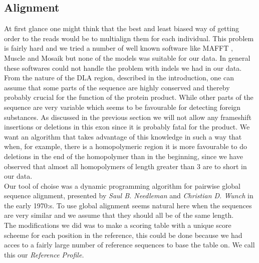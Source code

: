 \subsection{Alignment}



At first glance one might think that the best and least biased way of getting order to the reads would be to multialign them for each individual. This problem is fairly hard and we tried a number of well known software like MAFFT \cite{mafft} , Muscle \cite{muscle} and Mosaik \cite{mosaik} but none of the models was suitable for our data. In general these softwares could not handle the problem with indels we had in our data.\\
 
From the nature of the DLA region, described in the introduction, one can assume that some parts of the sequence are highly conserved and thereby probably crucial for the function of the protein product. While other parts of the sequence are very variable which seems to be favourable for detecting foreign substances. As discussed in the previous section we will not allow any frameshift insertions or deletions in this exon since it is probably fatal for the product. We want an algorithm that takes advantage of this knowledge in such a way that when, for example, there is a homopolymeric region it is more favourable to do deletions in the end of the homopolymer than in the beginning, since we have observed that almost all homopolymers of length greater than 3 are to short in our data.\\

Our tool of choise was a dynamic programming algorithm for pairwise global sequence alignment, presented by \emph{Saul B. Needleman} and \emph{Christian D. Wunch} \cite{nw} in the early 1970:s. To use global alignment seems natural here when the sequences are very similar and we assume that they should all be of the same length.\\

The modifications we did was to make a scoring table with a unique score scheeme for each position in the reference, this could be done because we had acces to a fairly large number of reference sequences to base the table on. We call this our \emph{Reference Profile.}\\


